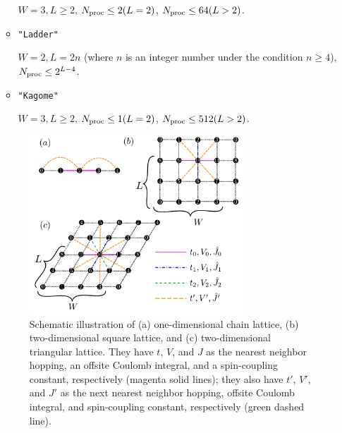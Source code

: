 \begin{itemize}
\begin{itemize}
    $W=3, L \geq 2$, $N_{\rm proc} \leq 2(L=2)$, $N_{\rm proc} \leq 64(L>2)$.

  \item \verb|"Ladder"|

    $W=2, L = 2n$ (where $n$ is an integer number under the condition  $n\geq4$),
    $N_{\rm proc} \leq 2^{L-4}$.

  \item \verb|"Kagome"|

    $W=3, L \geq 2$, $N_{\rm proc} \leq 1(L=2)$, $N_{\rm proc} \leq 512(L>2)$.

\end{itemize}

\begin{figure}[!tbhp]
  \begin{center}
    \includegraphics[width=8cm]{../figs/chap04_1_lattice.pdf}
    \caption{Schematic illustration of
      (a) one-dimensional chain lattice, 
      (b) two-dimensional square lattice, and 
      (c) two-dimensional triangular lattice.
      They have $t$, $V$, and $J$ as the nearest neighbor hopping, an offsite Coulomb integral, 
      and a spin-coupling constant, respectively (magenta solid lines);
      they also have $t'$, $V'$, and $J'$ as the next nearest neighbor hopping, offsite Coulomb integral, 
      and spin-coupling constant, respectively (green dashed line).
    }
    \label{fig_chap04_1_lattice}
  \end{center}
\end{figure}


\end{itemize}
